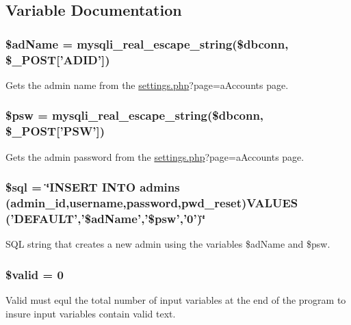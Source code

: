 \subsection{\-Variable \-Documentation}
\hypertarget{adminVal_8php_a3f42272d7be6f25532b7b50ff79517fc}{
\subsubsection[{\$ad\-Name}]{\setlength{\rightskip}{0pt plus 5cm}\$ad\-Name = mysqli\-\_\-real\-\_\-escape\-\_\-string(\$dbconn, \$\-\_\-\-P\-O\-S\-T\mbox{[}'\-A\-D\-I\-D'\mbox{]})}}\label{adminVal_8php_a3f42272d7be6f25532b7b50ff79517fc}
\-Gets the admin name from the \hyperlink{settings_8php}{settings.\-php}?page=a\-Accounts page. \hypertarget{adminVal_8php_a5b519c2c09881014890c26c8dc361242}{
\subsubsection[{\$psw}]{\setlength{\rightskip}{0pt plus 5cm}\$psw = mysqli\-\_\-real\-\_\-escape\-\_\-string(\$dbconn, \$\-\_\-\-P\-O\-S\-T\mbox{[}'\-P\-S\-W'\mbox{]})}}\label{adminVal_8php_a5b519c2c09881014890c26c8dc361242}
\-Gets the admin password from the \hyperlink{settings_8php}{settings.\-php}?page=a\-Accounts page. \hypertarget{adminVal_8php_a047170d6020a882807665812a27e2525}{
\subsubsection[{\$sql}]{\setlength{\rightskip}{0pt plus 5cm}\$sql = \char`\"{}\-I\-N\-S\-E\-R\-T \-I\-N\-T\-O admins (admin\-\_\-id,username,password,pwd\-\_\-reset)\-V\-A\-L\-U\-E\-S ('\-D\-E\-F\-A\-U\-L\-T','\$ad\-Name','\$psw','0')\char`\"{}}}\label{adminVal_8php_a047170d6020a882807665812a27e2525}
\-S\-Q\-L string that creates a new admin using the variables \$ad\-Name and \$psw. \hypertarget{adminVal_8php_a0587674d27d00ef497e08e53ccf45bbb}{
\subsubsection[{\$valid}]{\setlength{\rightskip}{0pt plus 5cm}\$valid = 0}}\label{adminVal_8php_a0587674d27d00ef497e08e53ccf45bbb}
\-Valid must equl the total number of input variables at the end of the program to insure input variables contain valid text. 